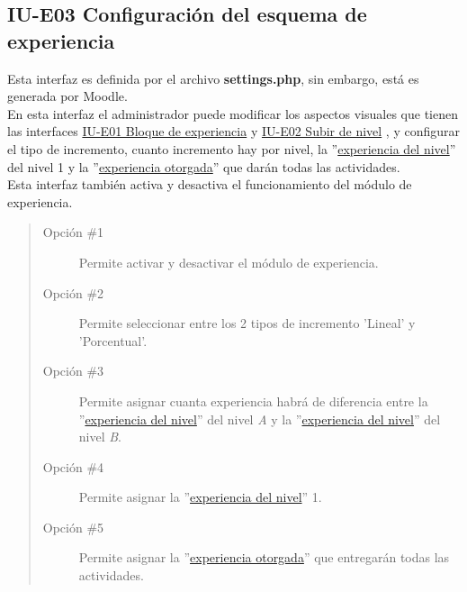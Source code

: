 \subsection*{IU-E03 Configuración del esquema de experiencia}
\label{IUE03}
    Esta interfaz es definida por el archivo \textbf{settings.php}, sin embargo, está es generada por Moodle.\\
    En esta interfaz el administrador puede modificar los aspectos visuales que tienen las interfaces \hyperref[IUE01]{IU-E01 Bloque de experiencia} y \hyperref[IUE02]{IU-E02 Subir de nivel} , y configurar el tipo de incremento, cuanto incremento hay por nivel, la ''\hyperref[table:METerminosExperiencia1]{experiencia del nivel}'' del nivel 1 y la ''\hyperref[table:METerminosExperiencia1]{experiencia otorgada}'' que darán todas las actividades.\\
    Esta interfaz también activa y desactiva el funcionamiento del módulo de experiencia.\\
    
    
    
    \begin{quote}
    \begin{description}
    	\item[Opción \#1] Permite activar y desactivar el módulo de experiencia.
    	\item[Opción \#2] Permite seleccionar entre los 2 tipos de incremento 'Lineal' y 'Porcentual'.
    	\item[Opción \#3] Permite asignar cuanta experiencia habrá de diferencia entre la ''\hyperref[table:METerminosExperiencia1]{experiencia del nivel}'' del nivel \textit{A} y la ''\hyperref[table:METerminosExperiencia1]{experiencia del nivel}'' del nivel \textit{B}.
    	\item[Opción \#4] Permite asignar la ''\hyperref[table:METerminosExperiencia1]{experiencia del nivel}'' 1.
    	\item[Opción \#5] Permite asignar la ''\hyperref[table:METerminosExperiencia1]{experiencia otorgada}'' que entregarán todas las actividades.
    \end{description}
    \end{quote}
    
\clearpage
    
